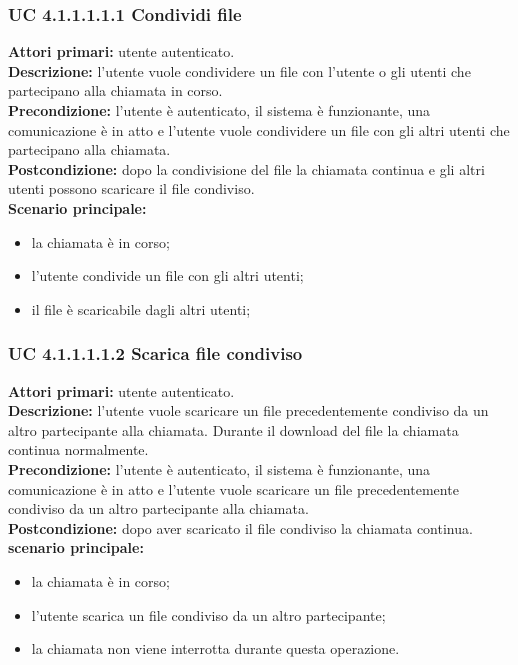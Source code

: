 \subsubsection{UC 4.1.1.1.1.1 Condividi file}
\noindent
\textbf{Attori primari:} utente autenticato.\\
\textbf{Descrizione:} l'utente vuole condividere un file con l'utente o gli utenti che partecipano alla chiamata in corso.\\
\textbf{Precondizione:} l'utente è autenticato, il sistema è funzionante, una comunicazione è in atto e l'utente vuole condividere un file con gli altri utenti che partecipano alla chiamata.\\
\textbf{Postcondizione:} dopo la condivisione del file la chiamata continua e gli altri utenti possono scaricare il file condiviso.\\
\textbf{Scenario principale:}
\begin{itemize}
\item la chiamata è in corso;
\item l'utente condivide un file con gli altri utenti;
\item il file è scaricabile dagli altri utenti;
\end{itemize}

\subsubsection{UC 4.1.1.1.1.2 Scarica file condiviso}
\noindent
\textbf{Attori primari:} utente autenticato.\\
\textbf{Descrizione:} l'utente vuole scaricare un file precedentemente condiviso da un altro partecipante alla chiamata. Durante il download del file la chiamata continua normalmente.\\
\textbf{Precondizione:} l'utente è autenticato, il sistema è funzionante, una comunicazione è in atto e l'utente vuole scaricare un file precedentemente condiviso da un altro partecipante alla chiamata.\\
\textbf{Postcondizione:} dopo aver scaricato il file condiviso la chiamata continua.\\
\textbf{scenario principale:}
\begin{itemize}
\item la chiamata è in corso;
\item l'utente scarica un file condiviso da un altro partecipante;
\item la chiamata non viene interrotta durante questa operazione.
\end{itemize}

